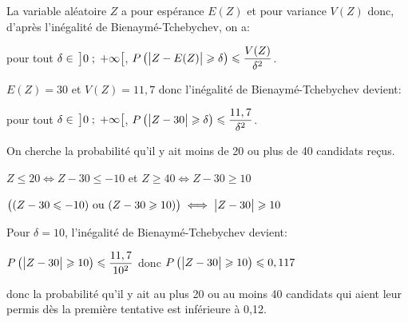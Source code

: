 \documentclass[10pt]{article}
\begin{document}
\begin{enumerate}
\begin{enumerate}
La variable aléatoire $Z$ a pour espérance $E(Z)$ et pour variance $V(Z)$ donc, d'après l'inégalité de Bienaymé-Tchebychev, on a:

pour tout $\delta\in\, \left ]0\;;\;+\infty\strut \right [$, $P\left ( \left |Z-E(Z)\strut \right | \geqslant \delta \right ) \leqslant \dfrac{V(Z)}{\delta^2}$.

$E(Z)=30$ et $V(Z)=11,7$ donc  l'inégalité de Bienaymé-Tchebychev devient:

pour tout $\delta\in\, \left ]0\;;\;+\infty\strut \right [$, $P\left ( \left |Z-30\strut \right | \geqslant \delta \right ) \leqslant \dfrac{11,7}{\delta^2}$.

On cherche la probabilité qu'il y ait moins de 20  ou plus de 40 candidats reçus.

$ Z\leqslant 20 \iff Z-30 \leqslant -10$ et $Z \geqslant 40 \iff Z-30 \geqslant 10$

$\left ( (Z-30 \leqslant -10) \text{ ou } (Z-30 \geqslant 10) \strut \right )\iff \left |Z-30 \strut \right | \geqslant 10$

Pour $\delta=10$, l'inégalité de Bienaymé-Tchebychev devient:

$P\left ( \left |Z-30\strut \right | \geqslant 10 \right ) \leqslant \dfrac{11,7}{10^2}$
donc
$P\left ( \left |Z-30\strut \right | \geqslant 10 \right ) \leqslant 0,117$

donc la probabilité qu'il y ait au plus 20 ou au moins 40 candidats qui aient leur permis dès la première tentative est inférieure à 0,12.
			\end{enumerate}
		\end{enumerate}

\bigskip
\end{document}
